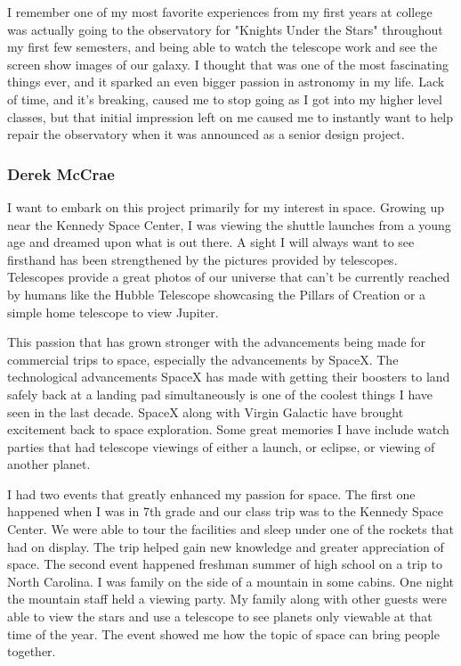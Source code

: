 \documentclass[12pt]{report}
\begin{document}
I remember one of my most favorite experiences from my first years at college was actually going to the observatory for "Knights Under the Stars" throughout my first few semesters, and being able to watch the telescope work and see the screen show images of our galaxy. I thought that was one of the most fascinating things ever, and it sparked an even bigger passion in astronomy in my life. Lack of time, and it's breaking, caused me to stop going as I got into my higher level classes, but that initial impression left on me caused me to instantly want to help repair the observatory when it was announced as a senior design project.

\subsubsection*{Derek McCrae}

I want to embark on this project primarily for my interest in space. Growing up near the Kennedy Space Center, I was viewing the shuttle launches from a young age and dreamed upon what is out there. A sight I will always want to see firsthand has been strengthened by the pictures provided by telescopes. Telescopes provide a great photos of our universe that can't be currently reached by humans like the Hubble Telescope showcasing the Pillars of Creation or a simple home telescope to view Jupiter.

This passion that has grown stronger with the advancements being made for commercial trips to space, especially the advancements by SpaceX. The technological advancements SpaceX has made with getting their boosters to land safely back at a landing pad simultaneously is one of the coolest things I have seen in the last decade. SpaceX along with Virgin Galactic have brought excitement back to space exploration. Some great memories I have include watch parties that had telescope viewings of either a launch, or eclipse, or viewing of another planet.

I had two events that greatly enhanced my passion for space. The first one happened when I was in 7th grade and our class trip was to the Kennedy Space Center. We were able to tour the facilities and sleep under one of the rockets that had on display. The trip helped gain new knowledge and greater appreciation of space. The second event happened freshman summer of high school on a trip to North Carolina. I was family on the side of a mountain in some cabins. One night the mountain staff held a viewing party. My family along with other guests were able to view the stars and use a telescope to see planets only viewable at that time of the year. The event showed me how the topic of space can bring people together.
\end{document}

